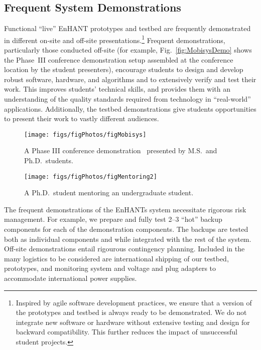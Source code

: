 \documentclass[journal,twopages]{IEEEtran}
\newcommand{\makered}[1]{\color{black}#1\color{black}}
\begin{document}
\subsection{Frequent System Demonstrations} Functional ``live'' EnHANT prototypes and testbed are frequently demonstrated in different on-site and off-site presentations.\footnote{Inspired by agile software development practices, we ensure that a version of the prototypes and testbed is always ready to be demonstrated. We do not integrate new software or hardware without extensive testing and design for backward compatibility.
This further reduces the impact of unsuccessful student projects.}
Frequent demonstrations, particularly those conducted off-site (for example, Fig.~\ref{fig:MobisysDemo} shows the Phase~III conference demonstration setup assembled at the conference location by the student presenters), encourage students to design and develop robust software, hardware, and algorithms and to extensively verify and test their work. This improves students' technical skills, and provides them with an understanding of the quality standards required from technology in ``real-world'' applications. Additionally, the testbed demonstrations give students opportunities to present their work to vastly different audiences.
\begin{figure}[t]
\begin{minipage}{0.4\columnwidth} 
\centering
\texttt{[image: figs/figPhotos/figMobisys]}\caption{A Phase III conference demonstration~\cite{MobiSys2011Demo} presented by M.S.\ and Ph.D.\ students.\label{fig:MobisysDemo}}
\end{minipage}
\hspace*{0.08\columnwidth}
\begin{minipage}{0.4\columnwidth}
\centering
\texttt{[image: figs/figPhotos/figMentoring2]}\centering
\caption{\label{fig:Mentoring} A Ph.D.\ student mentoring an undergraduate student.\\ }
\end{minipage}
\end{figure}

\makered{The frequent demonstrations of the EnHANTs system necessitate rigorous risk management. For example, we prepare and fully test 2--3 ``hot'' backup components for each of the demonstration components. The backups are tested both as individual components and while integrated with the rest of the system. Off-site demonstrations entail rigourous contingency planning. Included in the many logistics to be considered are international shipping of our testbed, prototypes, and monitoring system and voltage and plug adapters to accommodate international power supplies. }
\end{document}
